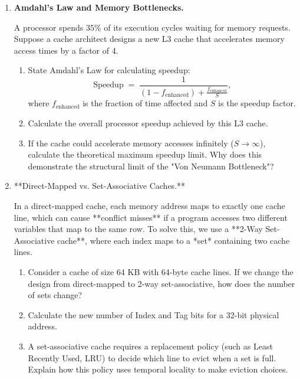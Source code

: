 \documentclass[12pt, a4paper]{book}
\begin{document}
\begin{problembox}
\begin{enumerate}[label=\textbf{P\arabic*.}]
  \item \textbf{Amdahl's Law and Memory Bottlenecks.}
  
        A processor spends $35\%$ of its execution cycles waiting for memory requests.
        Suppose a cache architect designs a new L3 cache that accelerates memory access times by a factor of 4.
        \begin{enumerate}[label=(\alph*)]
          \item State Amdahl's Law for calculating speedup:
                \[
                  \text{Speedup} \;=\; \frac{1}{(1 - f_{\text{enhanced}}) + \frac{f_{\text{enhanced}}}{S}},
                \]
                where $f_{\text{enhanced}}$ is the fraction of time affected and $S$ is the speedup factor.
          \item Calculate the overall processor speedup achieved by this L3 cache.
          \item If the cache could accelerate memory accesses infinitely ($S \to \infty$), calculate the theoretical maximum speedup limit.
                Why does this demonstrate the structural limit of the "Von Neumann Bottleneck"?
        \end{enumerate}

  \item **Direct-Mapped vs. Set-Associative Caches.**
  
        In a direct-mapped cache, each memory address maps to exactly one cache line, which can cause **conflict misses** if a program accesses two different variables that map to the same row.
        To solve this, we use a **2-Way Set-Associative cache**, where each index maps to a *set* containing two cache lines.
        \begin{enumerate}[label=(\alph*)]
          \item Consider a cache of size 64 KB with 64-byte cache lines.
                If we change the design from direct-mapped to 2-way set-associative, how does the number of sets change?
          \item Calculate the new number of Index and Tag bits for a 32-bit physical address.
          \item A set-associative cache requires a replacement policy (such as Least Recently Used, LRU) to decide which line to evict when a set is full.
                Explain how this policy uses temporal locality to make eviction choices.
        \end{enumerate}
\end{enumerate}
\end{problembox}
\end{document}
